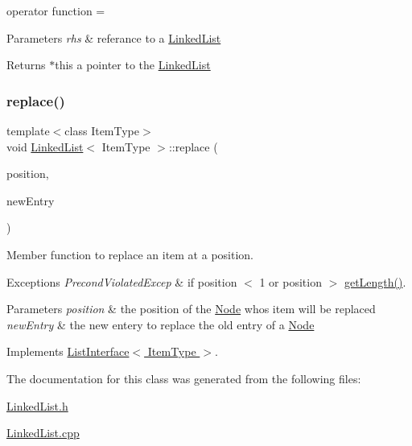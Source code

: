 operator function = 


\begin{DoxyParams}{Parameters}
{\em rhs} & referance to a \hyperlink{classLinkedList}{Linked\+List} \\
\hline
\end{DoxyParams}
\begin{DoxyReturn}{Returns}
$\ast$this a pointer to the \hyperlink{classLinkedList}{Linked\+List} 
\end{DoxyReturn}
\mbox{\label{classLinkedList_a3035f880c50e7d8f68e67c093d4607ca}} 
\subsubsection{\texorpdfstring{replace()}{replace()}}
{\footnotesize\ttfamily template$<$class Item\+Type$>$ \\
void \hyperlink{classLinkedList}{Linked\+List}$<$ Item\+Type $>$\+::replace (\begin{DoxyParamCaption}\item[{int}]{position,  }\item[{const Item\+Type \&}]{new\+Entry }\end{DoxyParamCaption})\hspace{0.3cm}{\ttfamily [virtual]}}



Member function to replace an item at a position. 


\begin{DoxyExceptions}{Exceptions}
{\em Precond\+Violated\+Excep} & if position $<$ 1 or position $>$ \hyperlink{classLinkedList_a61d045ef6008b494a1a516ecc992c0e7}{get\+Length()}.\\
\hline
\end{DoxyExceptions}

\begin{DoxyParams}{Parameters}
{\em position} & the position of the \hyperlink{classNode}{Node} whos item will be replaced \\
\hline
{\em new\+Entry} & the new entery to replace the old entry of a \hyperlink{classNode}{Node} \\
\hline
\end{DoxyParams}


Implements \hyperlink{classListInterface_aae877a56b7b9f5f526c37a00e234fad1}{List\+Interface$<$ Item\+Type $>$}.



The documentation for this class was generated from the following files\+:\begin{DoxyCompactItemize}
\item 
\hyperlink{LinkedList_8h}{Linked\+List.\+h}\item 
\hyperlink{LinkedList_8cpp}{Linked\+List.\+cpp}\end{DoxyCompactItemize}
